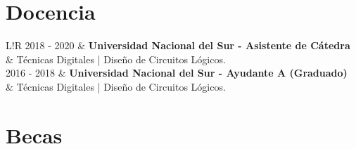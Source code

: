 \documentclass[10pt]{article}
\newcommand\VRule{\color{lightgray}\vrule width 0.5pt}
\begin{document}
\section{Docencia}
\begin{tabular}{L!{\VRule}R}
2018 - 2020 & {\bf Universidad Nacional del Sur - Asistente de Cátedra} \\
	 & Técnicas Digitales | Diseño de Circuitos Lógicos. \\[5pt]
	 
2016 - 2018 & {\bf Universidad Nacional del Sur - Ayudante A (Graduado)} \\
	 & Técnicas Digitales | Diseño de Circuitos Lógicos. \\
\end{tabular}

\section{Becas}
\end{document}
